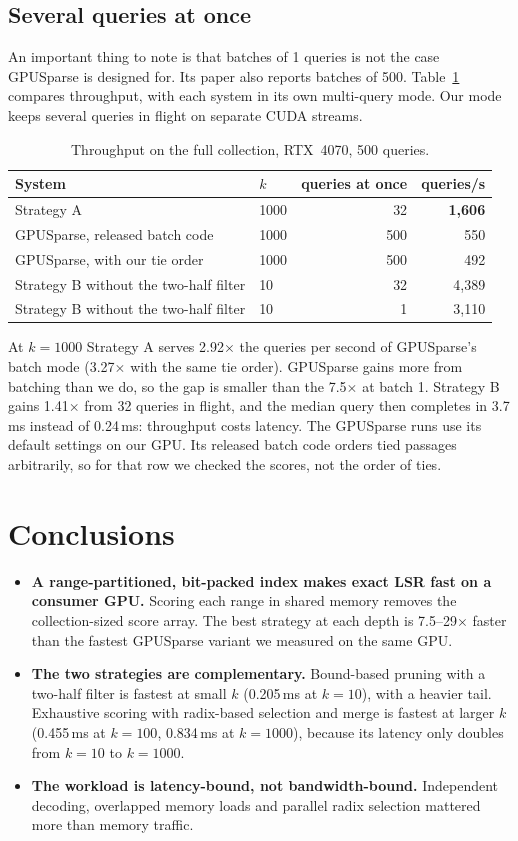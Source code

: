 \documentclass[11pt]{article}
\begin{document}
\subsection{Several queries at once}\label{sec:batch}
An important thing to note is that batches of 1 queries is not the case GPUSparse is designed for. Its paper also reports batches of 500. Table~\ref{tab:batch} compares
throughput, with each system in its own multi-query mode. Our mode keeps several queries in flight on separate
CUDA streams.
\begin{table}[H]
\centering
\caption{Throughput on the full collection, RTX~4070, 500 queries.}
\label{tab:batch}
\begin{tabular}{llrr}
\toprule
System & $k$ & queries at once & queries/s\\
\midrule
Strategy A & 1000 & 32 & \textbf{1,606}\\
GPUSparse, released batch code & 1000 & 500 & 550\\
GPUSparse, with our tie order & 1000 & 500 & 492\\
\midrule
Strategy B without the two-half filter & 10 & 32 & 4,389\\
Strategy B without the two-half filter & 10 & 1 & 3,110\\
\bottomrule
\end{tabular}
\end{table}
At $k=1000$ Strategy A serves 2.92$\times$ the queries per second of GPUSparse's batch mode (3.27$\times$ with the
same tie order). GPUSparse gains more from batching than we do, so the gap is smaller than the 7.5$\times$ at batch 1.
Strategy B gains 1.41$\times$ from 32 queries in flight, and the median query then completes in 3.7\,ms instead of
0.24\,ms: throughput costs latency. The GPUSparse runs use its default settings on our GPU. Its
released batch code orders tied passages arbitrarily, so for that row we checked the scores, not the order of ties.

\section{Conclusions}
\begin{itemize}
\item \textbf{A range-partitioned, bit-packed index makes exact LSR fast on a consumer GPU.} Scoring each
  range in shared memory removes the collection-sized score array. The best strategy at each depth is
  7.5--29$\times$ faster than the fastest GPUSparse variant we measured on the same GPU.
\item \textbf{The two strategies are complementary.} Bound-based pruning with a two-half filter is fastest
  at small $k$ (0.205\,ms at $k=10$), with a heavier tail. Exhaustive scoring with radix-based selection and merge is fastest
  at larger $k$ (0.455\,ms at $k=100$, 0.834\,ms at $k=1000$), because its latency only doubles from $k=10$ to $k=1000$.
\item \textbf{The workload is latency-bound, not bandwidth-bound.} Independent decoding, overlapped
  memory loads and parallel radix selection mattered more than memory traffic.
\end{itemize}
\end{document}
